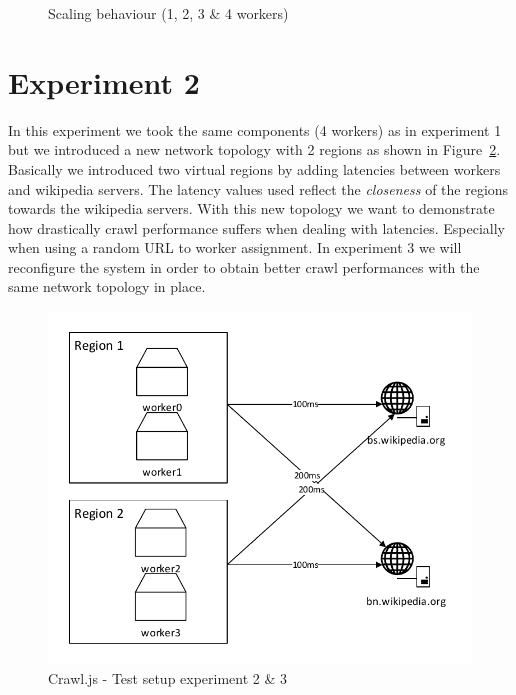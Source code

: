 \newline
\newline
\begin{figure}
\centering
\caption{Scaling behaviour (1, 2, 3 \& 4 workers)}
\label{plot:exp_001}
\end{figure}

\section{Experiment 2}

In this experiment we took the same components (4 workers) as in experiment 1 but we introduced a new network topology with 2 regions as shown in Figure~\ref{test_setup2}. Basically we introduced two virtual regions by adding latencies between workers and wikipedia servers. The latency values used reflect the \emph{closeness} of the regions towards the wikipedia servers. With this new topology we want to demonstrate how drastically crawl performance suffers when dealing with latencies. Especially when using a random URL to worker assignment. In experiment 3 we will reconfigure the system in order to obtain better crawl performances with the same network topology in place.

\begin{figure}[h]
\centering
  \includegraphics[width=1.0\textwidth]{Figures/test_setup2.pdf}
  \caption{Crawl.js - Test setup experiment 2 \& 3}
\label{test_setup2}
\end{figure}

